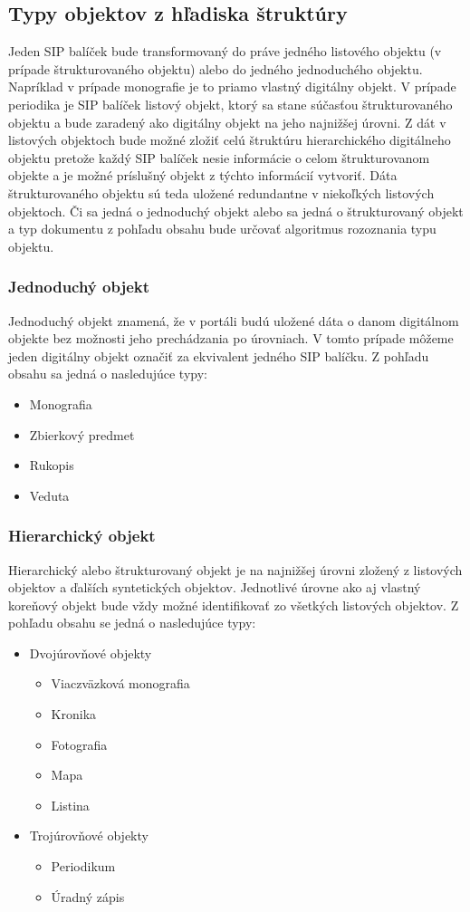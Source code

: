 \documentclass[
  print, %
  table,   %
  lof,     %
  nolot,     %
]{fithesis3}
\begin{document}
\subsection{Typy objektov z hľadiska štruktúry}
Jeden SIP balíček bude transformovaný do práve jedného listového objektu (v prípade štrukturovaného objektu) alebo do jedného jednoduchého objektu. Napríklad v prípade monografie je to priamo vlastný digitálny objekt. V prípade periodika je SIP balíček listový objekt, ktorý sa stane súčasťou štrukturovaného objektu a bude zaradený ako digitálny objekt na jeho najnižšej úrovni.
Z dát v listových objektoch bude možné zložiť celú štruktúru hierarchického digitálneho objektu pretože každý SIP balíček nesie informácie o celom štrukturovanom objekte a je možné príslušný objekt z týchto informácií vytvoriť. Dáta štrukturovaného objektu sú teda uložené redundantne v niekoľkých listových objektoch.
Či sa jedná o jednoduchý objekt alebo sa jedná o štrukturovaný objekt a typ dokumentu z pohľadu obsahu bude určovať algoritmus rozoznania typu objektu. 
\subsubsection{Jednoduchý objekt}
Jednoduchý objekt znamená, že v portáli budú uložené dáta o danom digitálnom objekte bez možnosti jeho prechádzania po úrovniach. V tomto prípade môžeme jeden digitálny objekt označiť za ekvivalent jedného SIP balíčku.
Z pohľadu obsahu sa jedná o nasledujúce typy:
\begin{itemize}
	\item Monografia
	\item Zbierkový predmet
	\item Rukopis
	\item Veduta
\end{itemize}
\subsubsection{Hierarchický objekt}
Hierarchický alebo štrukturovaný objekt je na najnižšej úrovni zložený z listových objektov a ďalších syntetických objektov. Jednotlivé úrovne ako aj vlastný koreňový objekt bude vždy možné identifikovať zo všetkých listových objektov. Z pohľadu obsahu se jedná o nasledujúce typy:
\begin{itemize}
\item Dvojúrovňové objekty
	\begin{itemize}
	\item Viaczväzková monografia
	\item Kronika
	\item Fotografia	
	\item Mapa
	\item Listina
	\end{itemize}
\item Trojúrovňové objekty
	\begin{itemize}
	\item Periodikum
	\item Úradný zápis	
	\end{itemize}
\end{itemize}
\end{document}
